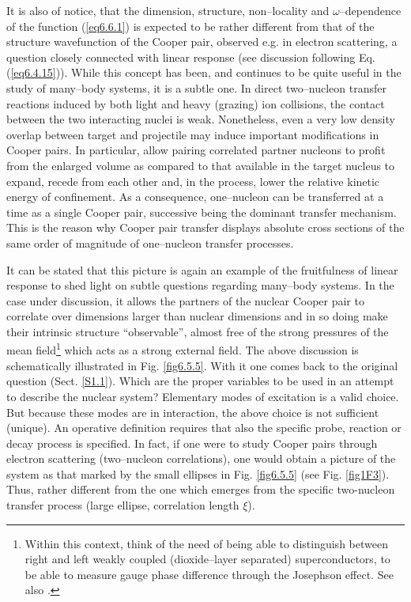 It is also of notice, that the dimension, structure, non--locality and $\omega$--dependence of the function (\ref{eq6.6.1}) is expected to be rather different from that of the structure wavefunction of the Cooper pair, observed e.g. in electron scattering, a question closely connected with linear response (see discussion following Eq. (\ref{eq6.4.15})). While this concept has been, and continues to be quite useful in the study of many--body systems, it is a subtle one. In direct two--nucleon transfer reactions induced by both light and heavy (grazing) ion  collisions, the contact between the two interacting nuclei is weak. Nonetheless, even a very low density overlap between target and projectile may induce important modifications in Cooper pairs. In particular, allow pairing correlated partner nucleons  to profit from the enlarged volume as compared to that available in the target nucleus to expand, recede from each other and, in the process, lower the relative kinetic energy of confinement. As a consequence, one--nucleon can be transferred at a time as a single Cooper pair, successive being the dominant transfer mechanism. This is the reason why Cooper pair transfer displays absolute cross sections of the same order of magnitude of one--nucleon transfer processes. 


It can be stated that this picture is again an example of the fruitfulness of linear response to shed light on subtle questions regarding many--body systems. In the case under discussion, it allows the partners of the nuclear Cooper pair to correlate over dimensions larger than nuclear dimensions and in so doing make their intrinsic structure ``observable'', almost free of the strong pressures of the  mean field\footnote{Within this context, think of the need of being able to distinguish between   right and left weakly coupled (dioxide--layer separated) superconductors,  to be able to measure gauge phase difference through the Josephson effect. See also \cite{Magierski:17}.} which acts as a strong external field. The above discussion is schematically illustrated in Fig. \ref{fig6.5.5}. With it one comes back to the original question (Sect. \ref{S1.1}). Which are the proper variables to be used in an attempt to describe the nuclear system? Elementary modes of excitation is a valid choice. But because these modes are in interaction, the above choice is not sufficient (unique). An operative definition requires that also the specific probe, reaction or decay process is specified. In fact, if one were to study Cooper pairs through electron scattering (two--nucleon correlations), one would obtain a picture of the system as that marked by the small ellipses in Fig. \ref{fig6.5.5} (see Fig. \ref{fig1F3}). Thus, rather different from the one  which emerges from the specific two-nucleon transfer process (large ellipse, correlation length $\xi$).  
